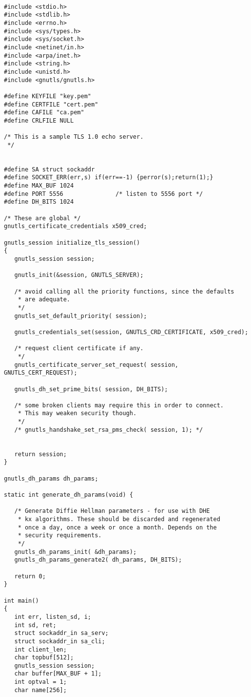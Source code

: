 \begin{verbatim}

#include <stdio.h>
#include <stdlib.h>
#include <errno.h>
#include <sys/types.h>
#include <sys/socket.h>
#include <netinet/in.h>
#include <arpa/inet.h>
#include <string.h>
#include <unistd.h>
#include <gnutls/gnutls.h>

#define KEYFILE "key.pem"
#define CERTFILE "cert.pem"
#define CAFILE "ca.pem"
#define CRLFILE NULL

/* This is a sample TLS 1.0 echo server.
 */


#define SA struct sockaddr
#define SOCKET_ERR(err,s) if(err==-1) {perror(s);return(1);}
#define MAX_BUF 1024
#define PORT 5556               /* listen to 5556 port */
#define DH_BITS 1024

/* These are global */
gnutls_certificate_credentials x509_cred;

gnutls_session initialize_tls_session()
{
   gnutls_session session;

   gnutls_init(&session, GNUTLS_SERVER);

   /* avoid calling all the priority functions, since the defaults
    * are adequate.
    */
   gnutls_set_default_priority( session);   

   gnutls_credentials_set(session, GNUTLS_CRD_CERTIFICATE, x509_cred);

   /* request client certificate if any.
    */
   gnutls_certificate_server_set_request( session, GNUTLS_CERT_REQUEST);

   gnutls_dh_set_prime_bits( session, DH_BITS);

   /* some broken clients may require this in order to connect. 
    * This may weaken security though.
    */
   /* gnutls_handshake_set_rsa_pms_check( session, 1); */

   
   return session;
}

gnutls_dh_params dh_params;

static int generate_dh_params(void) {

   /* Generate Diffie Hellman parameters - for use with DHE
    * kx algorithms. These should be discarded and regenerated
    * once a day, once a week or once a month. Depends on the
    * security requirements.
    */
   gnutls_dh_params_init( &dh_params);
   gnutls_dh_params_generate2( dh_params, DH_BITS);
   
   return 0;
}

int main()
{
   int err, listen_sd, i;
   int sd, ret;
   struct sockaddr_in sa_serv;
   struct sockaddr_in sa_cli;
   int client_len;
   char topbuf[512];
   gnutls_session session;
   char buffer[MAX_BUF + 1];
   int optval = 1;
   char name[256];


\end{verbatim}
